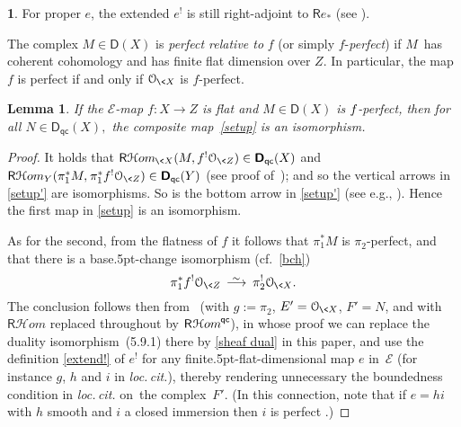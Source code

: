 \documentclass{compositio}
\theoremstyle{plain}
\newtheorem{sublem}[equation]{Lemma}
\theoremstyle{definition}
\newtheorem{cosa}[thm]{}
\theoremstyle{remark}
\numberwithin{equation}{thm}
\begin{document}
\begin{cosa}
For proper $e$, the extended $e^!$ is still right-adjoint to ${\mathsf R} e_*$ (see \cite[proof of Prop.\,5.9.3]{AJL3}).

The complex $M\in{\boldsymbol{\mathsf{D}}}(X)$ is \emph{perfect relative to} $f$ (or simply $f$-\emph{perfect}) if $M$~has coherent cohomology and has
finite flat dimension over $Z$. In particular, the map~$f$ is perfect if and only if
${\mathcal O_{{\mkern-1mu}\<X}}$ is $f$-perfect.

\begin{sublem}
\label{Gmap}
If\/ the\/ ${\mathscr{E}}$-map\/ $f\colon X\to Z$ is flat and\/ $M\in{\boldsymbol{\mathsf{D}}}(X)$ is $f{\mkern-1mu}$-perfect, then for all\/ \mbox{$N\in{{\boldsymbol{\mathsf{D}}}_{\mathsf{qc}}}(X),$} the composite map\/~\eqref{setup} is an isomorphism.
\end{sublem}

\begin{proof} It holds  that
${\mathsf R}{{\mathcal H} om}_{{{\mkern-1mu}\<X}}(M,f^!{\mathcal O_{\<Z}})\in{{\boldsymbol{\mathsf{D}}}_{\mathsf{qc}}}(X)$ and 
${\mathsf R}{{\mathcal H} om}_Y(\pi_1^*M,{\mkern1mu}\pi_1^*f^!{\mathcal O_{\<Z}})\in{{\boldsymbol{\mathsf{D}}}_{\mathsf{qc}}}(Y)$ (see proof of~\cite[6.6]{AILN}); and so the vertical 
arrows in \eqref{setup'} are isomorphisms. 
So is the bottom arrow in \eqref{setup'}
 (see e.g., \cite[ (4.6.6)]{li}). Hence the first map in \eqref{setup} is an
 isomorphism. 

As for the second, from the flatness of $f$ it follows that 
$\pi_1^*M$ is $\pi^{}_2$-perfect, and that there is a base{\kern.5pt}-change isomorphism (cf.~\eqref{bch})
\begin{equation}\label{bch2}
\pi_1^*f^!{\mathcal O_{\<Z}}{{\mkern8mu\longrightarrow \mkern-25.5mu{}^\sim\mkern17mu}}\pi_2^!{\mathcal O_{{\mkern-1mu}\<X}}.
\end{equation}
 The conclusion follows then from~\cite[6.6]{AILN} (with $g{\!:=}\pi^{}_2$, 
 $E'={\mathcal O_{{\mkern-1mu}\<X}}$, $F'=N$, and with ${\mathsf R}{{\mathcal H} om}$ replaced throughout by ${{\mathsf R}{\mkern1mu}{{\mathcal H} om}_{{}}^{{\mkern-1mu}{\mathsf{qc}}}}$), in whose proof we can replace the duality isomorphism~(5.9.1) there by \eqref{sheaf dual} in this paper, and use the definition \eqref{extend!} of $e^!$ for any finite{\kern.5pt}-flat-dimensional map $e$ in~${\mathscr{E}}$ (for instance $g$, $h$ and $i$ in \emph{loc.\,cit.}), thereby rendering unnecessary the boundedness condition  in \emph{loc.\,cit.} on~the complex~$F'$.  (In this connection, note  that if $e=hi$ with $h$  smooth and $i$  a closed immersion then $i$ is perfect 
 \mbox{\cite[p.\,246, 3.6]{Il}}.)
\end{proof}


\end{cosa}
\end{document}
